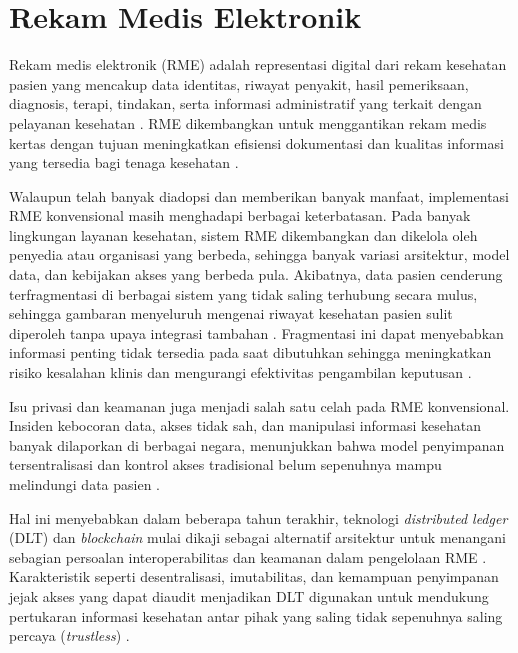 \section{Rekam Medis Elektronik}\label{sec:rme}

Rekam medis elektronik (RME) adalah representasi digital dari rekam kesehatan pasien yang mencakup data identitas, riwayat penyakit, hasil pemeriksaan, diagnosis, terapi, tindakan, serta informasi administratif yang terkait dengan pelayanan kesehatan \parencite{Carlos_Ferreira2024_EHR_Enhancing_Interoperability_Security,Han2022_Blockchain_technology_EHR}.
RME dikembangkan untuk menggantikan rekam medis kertas dengan tujuan meningkatkan efisiensi dokumentasi dan kualitas informasi yang tersedia bagi tenaga kesehatan \parencite{Han2022_Blockchain_technology_EHR}.

Walaupun telah banyak diadopsi dan memberikan banyak manfaat, implementasi RME konvensional masih menghadapi berbagai keterbatasan.
Pada banyak lingkungan layanan kesehatan, sistem RME dikembangkan dan dikelola oleh penyedia atau organisasi yang berbeda, sehingga banyak variasi arsitektur, model data, dan kebijakan akses yang berbeda pula.
Akibatnya, data pasien cenderung terfragmentasi di berbagai sistem yang tidak saling terhubung secara mulus, sehingga gambaran menyeluruh mengenai riwayat kesehatan pasien sulit diperoleh tanpa upaya integrasi tambahan \parencite{Carlos_Ferreira2024_EHR_Enhancing_Interoperability_Security}.
Fragmentasi ini dapat menyebabkan informasi penting tidak tersedia pada saat dibutuhkan sehingga meningkatkan risiko kesalahan klinis dan mengurangi efektivitas pengambilan keputusan \parencite{Han2022_Blockchain_technology_EHR}.

Isu privasi dan keamanan juga menjadi salah satu celah pada RME konvensional.
Insiden kebocoran data, akses tidak sah, dan manipulasi informasi kesehatan banyak dilaporkan di berbagai negara, menunjukkan bahwa model penyimpanan tersentralisasi dan kontrol akses tradisional belum sepenuhnya mampu melindungi data pasien \parencite{Han2022_Blockchain_technology_EHR}.

Hal ini menyebabkan dalam beberapa tahun terakhir, teknologi \emph{distributed ledger} (DLT) dan \textit{blockchain} mulai dikaji sebagai alternatif arsitektur untuk menangani sebagian persoalan interoperabilitas dan keamanan dalam pengelolaan RME \parencite{Kuo_2017_DLT_EHR}.
Karakteristik seperti desentralisasi, imutabilitas, dan kemampuan penyimpanan jejak akses yang dapat diaudit menjadikan DLT digunakan untuk mendukung pertukaran informasi kesehatan antar pihak yang saling tidak sepenuhnya saling percaya (\textit{trustless}) \parencite{Rawat2025_Blockchain_Secure_EHR}.